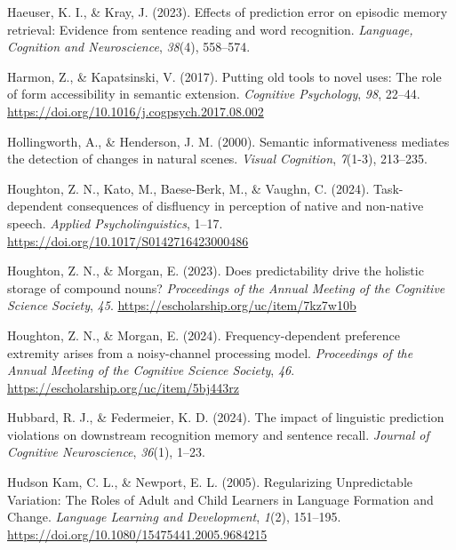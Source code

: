 \documentclass[
  12pt,
]{scrartcl}
\newlength{\cslhangindent}
\newenvironment{CSLReferences}[2] %
 {\begin{list}{}{%
  \setlength{\itemindent}{0pt}
  \setlength{\leftmargin}{0pt}
  \setlength{\parsep}{0pt}
  \ifodd #1
   \setlength{\leftmargin}{\cslhangindent}
   \setlength{\itemindent}{-1\cslhangindent}
  \fi
  \setlength{\itemsep}{#2\baselineskip}}}
 {\end{list}}
\begin{document}
\begin{CSLReferences}{1}{0}
Haeuser, K. I., \& Kray, J. (2023). Effects of prediction error on
episodic memory retrieval: Evidence from sentence reading and word
recognition. \emph{Language, Cognition and Neuroscience}, \emph{38}(4),
558--574.

Harmon, Z., \& Kapatsinski, V. (2017). Putting old tools to novel uses:
The role of form accessibility in semantic extension. \emph{Cognitive
Psychology}, \emph{98}, 22--44.
\url{https://doi.org/10.1016/j.cogpsych.2017.08.002}

Hollingworth, A., \& Henderson, J. M. (2000). Semantic informativeness
mediates the detection of changes in natural scenes. \emph{Visual
Cognition}, \emph{7}(1-3), 213--235.

Houghton, Z. N., Kato, M., Baese-Berk, M., \& Vaughn, C. (2024).
Task-dependent consequences of disfluency in perception of native and
non-native speech. \emph{Applied Psycholinguistics}, 1--17.
\url{https://doi.org/10.1017/S0142716423000486}

Houghton, Z. N., \& Morgan, E. (2023). Does predictability drive the
holistic storage of compound nouns? \emph{Proceedings of the Annual
Meeting of the Cognitive Science Society}, \emph{45}.
\url{https://escholarship.org/uc/item/7kz7w10b}

Houghton, Z. N., \& Morgan, E. (2024). Frequency-dependent preference
extremity arises from a noisy-channel processing model.
\emph{Proceedings of the Annual Meeting of the Cognitive Science
Society}, \emph{46}. \url{https://escholarship.org/uc/item/5bj443rz}

Hubbard, R. J., \& Federmeier, K. D. (2024). The impact of linguistic
prediction violations on downstream recognition memory and sentence
recall. \emph{Journal of Cognitive Neuroscience}, \emph{36}(1), 1--23.

Hudson Kam, C. L., \& Newport, E. L. (2005). Regularizing Unpredictable
Variation: The Roles of Adult and Child Learners in Language Formation
and Change. \emph{Language Learning and Development}, \emph{1}(2),
151--195. \url{https://doi.org/10.1080/15475441.2005.9684215}


\end{CSLReferences}
\end{document}
